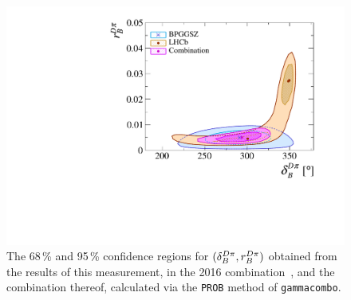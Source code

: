 \begin{figure}[tp]
    \centering
    \includegraphics[width=0.7\columnwidth]{figures/analysis/interpretation/2d_d_dpi_r_dpi_vs_old_lhcb_prob.pdf}
    \caption{The 68\,\% and 95\,\% confidence regions for $(\delta_B^{{D}\pi}, r_B^{{D}\pi})$ obtained from the results of this measurement, in the 2016 \lhcb combination~\cite{LHCb-PAPER-2016-032}, and the combination thereof, calculated via the \texttt{PROB} method of \texttt{gammacombo}.}
    \label{fig:lhcb_dpi_comp_2d}
\end{figure}

